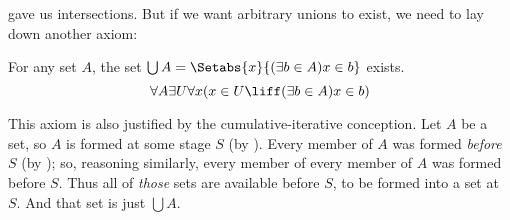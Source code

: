 \documentclass[../../../include/open-logic-section]{subfiles}
\begin{document}

 gave us intersections.
But if we want arbitrary unions to exist, we need to lay down another
axiom:

\begin{axiom}[Union] For any set $A$, the set $\bigcup A =
\Setabs{x}{(\exists b \in A) x \in b}$ exists.
\[
	\forall A \exists U \forall x(x \in U \liff (\exists b \in A)x \in b)
\]
\end{axiom}

This axiom is also justified by the cumulative-iterative conception.
Let $A$ be a set, so $A$ is formed at some stage $S$ (by \stageshier).
Every member of $A$ was formed \emph{before}  $S$ (by \stagesacc); so,
reasoning similarly, every member of every member of $A$ was formed
before $S$. Thus all of \emph{those} sets are available before $S$, to
be formed into a set at $S$. And that set is just $\bigcup A$.
\end{document}
